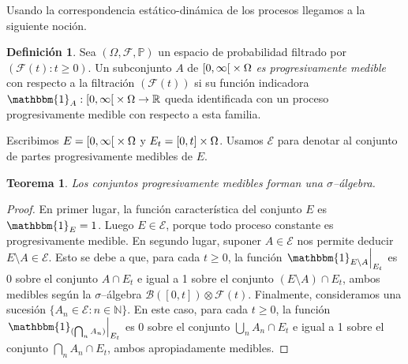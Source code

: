 \documentclass{report}
\newcommand{\leftOpenInterval}{\left]}
\newcommand{\rightOpenInterval}{\right[}
\newcommand{\leftClosedInterval}{\left[}
\newcommand{\rightClosedInterval}{\right]}
\newcommand{\interval}[3]{%
    \ifstrequal{#1}{oo}{%
      \leftOpenInterval #2, #3 \rightOpenInterval%
    }{%
      \ifstrequal{#1}{co}{%
        \leftClosedInterval #2, #3 \rightOpenInterval%
      }{%
        \ifstrequal{#1}{oc}{
          \leftOpenInterval #2, #3 \rightClosedInterval%
        }{%
          \ifstrequal{#1}{cc}{
            \leftClosedInterval #2, #3 \rightClosedInterval
          }{%
          }%
        }%
      }%
    }%
  }
\newcommand{\restrict}[2]{\left.#1\right|_{#2}}
\newcommand{\characteristic}{\mathbbm{1}}
\newcommand{\prob}{\mathbb{P}}
\newcommand{\events}{\mathcal{F}}
\newcommand{\borel}{\mathcal{B}}
\newcommand{\progressiveAlgebra}{\mathscr{E}}
\newcommand{\naturalNumbers}{\mathbb{N}}
\newcommand{\realNumbers}{\mathbb{R}}
\theoremstyle{plain}
\newtheorem{theorem}{Teorema}
\newtheorem{property}{Propiedad}
\theoremstyle{remark}
\theoremstyle{definition}
\newtheorem{definition}{Definición}
\begin{document}

Usando la correspondencia estático-dinámica de los procesos llegamos a la siguiente noción. 
\begin{definition}
  Sea \((\Omega, \events, \prob)\) un espacio de probabilidad filtrado por \((\events(t) : t \geq 0)\).
  Un subconjunto \(A\) de \(\interval{co}{0}{\infty} \times \Omega\) \emph{es progresivamente medible} con respecto a la filtración \((\events(t))\) si su función indicadora \(\characteristic_A : \interval{co}{0}{\infty} \times \Omega \rightarrow \realNumbers\) queda identificada con un proceso progresivamente medible con respecto a esta familia.

  Escribimos \(E = \interval{co}{0}{\infty} \times \Omega\) y \(E_t = \interval{cc}{0}{t} \times \Omega\). Usamos \(\progressiveAlgebra\) para denotar al conjunto de partes progresivamente medibles de \(E\).
\end{definition}


\begin{theorem}
  Los conjuntos progresivamente medibles forman una \(\sigma\)--álgebra.
\end{theorem}
\begin{proof}
  En primer lugar, la función característica del conjunto \(E\) es \({\characteristic_E = 1}\).
  Luego \(E \in \progressiveAlgebra\), porque todo proceso constante es progresivamente medible.
  En segundo lugar, suponer \(A \in \progressiveAlgebra\) nos permite deducir \(E \setminus A \in \progressiveAlgebra\).
  Esto se debe a que, para cada \(t \geq 0\), la función \(\restrict{\characteristic_{E \setminus A}}{E_t}\) es 0 sobre el conjunto \(A \cap E_t\) e igual a 1 sobre el conjunto \((E \setminus A) \cap E_t\), ambos medibles según la \(\sigma\)--álgebra \(\borel([0, t]) \otimes \events(t)\).
  Finalmente, consideramos una sucesión \(\{A_n \in \progressiveAlgebra : n \in \naturalNumbers\}\).
  En este caso, para cada \(t \geq 0\), la función \(\restrict{\characteristic_{(\bigcap_n A_n)}}{E_t}\)
  es 0 sobre el conjunto \(\bigcup_n A_n \cap E_t\) e igual a 1 sobre el conjunto \(\bigcap_n A_n \cap E_t\), ambos apropiadamente medibles.
\end{proof}
\end{document}
